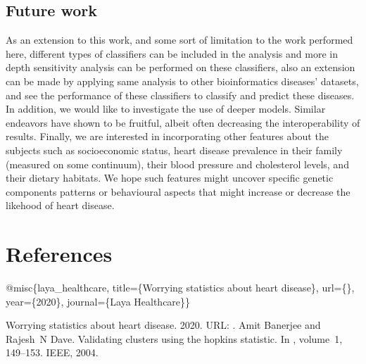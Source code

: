 \documentclass[letterpaper,10pt,english]{jupyterBook}
\begin{document}
\section{Future work}
\label{\detokenize{Conclusion:future-work}}
\sphinxAtStartPar
As an extension to this work, and some sort of limitation to the work performed here,
different types of classifiers can be included in the analysis and more in depth sensitivity analysis can be performed on these classifiers, also an extension can be made by applying same analysis to other bioinformatics diseases’ datasets, and see the performance of these classifiers to classify and predict these diseases. In addition, we would like to investigate the use of deeper models. Similar endeavors have shown to be fruitful, albeit often decreasing the interoperability of results.  Finally, we are interested in incorporating other features about the subjects such as socio\sphinxhyphen{}economic status,  heart disease prevalence in their family (measured on some continuum), their blood pressure and  cholesterol levels, and their dietary habitats. We hope such features might uncover specific genetic components  patterns or behavioural aspects that might increase or decrease the likehood of heart disease.

\sphinxstepscope


\chapter{References}
\label{\detokenize{References:references}}\label{\detokenize{References::doc}}
\sphinxAtStartPar
@misc\{laya\_healthcare,
title=\{Worrying statistics about heart disease\}, url=\{\},
year=\{2020\},
journal=\{Laya Healthcare\}\}

\begin{sphinxthebibliography}{1}
\sphinxAtStartPar
Worrying statistics about heart disease. 2020. URL: .
\sphinxAtStartPar
Amit Banerjee and Rajesh N Dave. Validating clusters using the hopkins statistic. In , volume 1, 149–153. IEEE, 2004.
\end{sphinxthebibliography}







\renewcommand{\indexname}{Index}
\printindex
\end{document}
